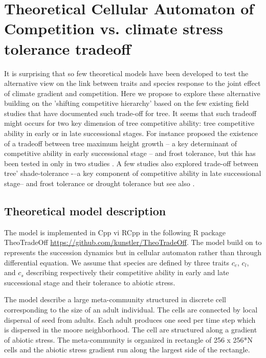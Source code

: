 \documentclass[a4paper,11pt]{article}
\begin{document}
\clearpage

\section{Theoretical Cellular Automaton of Competition vs. climate stress tolerance tradeoff}

It is surprising that so few theoretical models have been developed to test the alternative view on the link between traits and species response to the joint effect of climate gradient and competition.
Here we propose to explore these alternative building on the 'shifting competitive hierarchy' based on the few existing field studies that have documented such trade-off for tree. It seems that such tradeoff might occurs for two key dimension of tree competitive ability: tree competitive ability in early or in late successional stages. For instance \citep{Loehle-1998} proposed the existence of a tradeoff between tree maximum height growth – a key determinant of competitive ability in early successional stage – and frost tolerance, but this has been tested in only in two studies \citep{Koehler-2012,Savage-2013}. A few studies also explored trade-off between tree’ shade-tolerance -–a key component of competitive ability in late successional stage-- and frost tolerance \citep{Lusk-2013} or drought tolerance \citep[see][]{Smith-1989,Niinemets-2006} but see also \citep{Sack-2004,Markesteijn-2011}.


\subsection{Theoretical model description}

The model is implemented in Cpp vi RCpp in the following R package 
TheoTradeOff \url{https://github.com/kunstler/TheoTradeOff}. The 
model build on \citet{Pacala-1998} to represents the succession 
dynamics but in cellular automaton rather than through 
differential equation. We assume that species are defined by three 
traits $c_e$, $c_l$, and $c_s$ describing 
respectively their competitive ability in early and late successional stage and their 
tolerance to abiotic stress.

The model describe a large meta-community structured in discrete cell
corresponding  to the  size of  an  adult individual.   The cells  are
connected  by local  dispersal  of  seed from  adults. Each adult
produces one seed per time step which is dispersed in the moore
neighborhood.  The cell  are structured along a  gradient of
abiotic stress. The meta-community is organized in rectangle of
256 x 256*N cells  and the abiotic stress  gradient run along the
largest side of the rectangle. 
\end{document}
